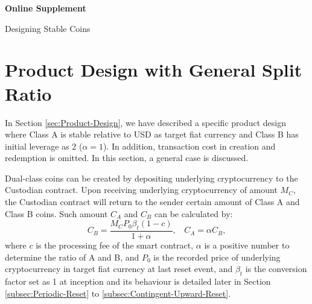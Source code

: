 \documentclass[draft, noinfoline]{ectaart}
\numberwithin{equation}{section}
\theoremstyle{plain}
\begin{document}
\begin{appendices}



%



\begin{center}
{\Large \bf  Online Supplement}

\medskip

{\Large Designing Stable Coins}

\end{center}









\section{Product Design with General Split Ratio}
\label{subsec:General-Product-Design}


In Section \ref{sec:Product-Design}, we have described a specific product design where Class A is stable relative to USD as target fiat currency and Class B has initial leverage as 2 ($\alpha=1$). In addition, transaction cost in creation and redemption is omitted. In this section, a general case is discussed.


Dual-class coins can be created by depositing underlying cryptocurrency to the Custodian contract. Upon receiving underlying cryptocurrency of amount $M_{C}$, the Custodian contract will return to the sender certain amount of Class A and Class B coins. Such amount $C_{A}$ and $C_{B}$ can be calculated by:
\begin{equation}
C_{B}=  \frac{M_{C} P_{0}\beta_t\left(1-c\right)}{1+\alpha},~~~~
C_{A}=  \alpha C_{B},
\label{eq:creation-1}
\end{equation}
where $c$ is the processing fee of the smart contract, $\alpha$ is a positive number to determine the ratio of A and B, and $P_{0}$ is the recorded price of underlying cryptocurrency in target fiat currency at last reset event, and $\beta_t$ is the conversion factor set as 1 at inception and its behaviour is detailed later in Section \ref{subsec:Periodic-Reset} to \ref{subsec:Contingent-Upward-Reset}.


\end{appendices}
\end{document}
